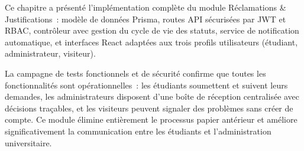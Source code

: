 Ce chapitre a présenté l'implémentation complète du module
Réclamations \& Justifications~: modèle de données Prisma, routes API
sécurisées par JWT et RBAC, contrôleur avec gestion du cycle de vie des
statuts, service de notification automatique, et interfaces React adaptées
aux trois profils utilisateurs (étudiant, administrateur, visiteur).

La campagne de tests fonctionnels et de sécurité confirme que toutes les
fonctionnalités sont opérationnelles~: les étudiants soumettent et suivent
leurs demandes, les administrateurs disposent d'une boîte de réception
centralisée avec décisions traçables, et les visiteurs peuvent signaler des
problèmes sans créer de compte. Ce module élimine entièrement le processus
papier antérieur et améliore significativement la communication entre les
étudiants et l'administration universitaire.
